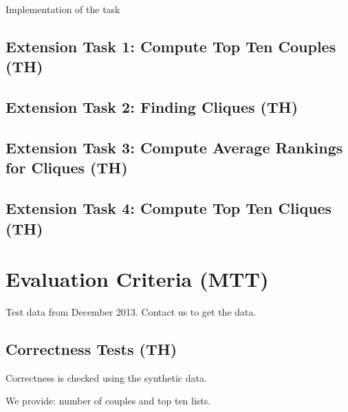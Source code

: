 \documentclass[a4paper]{article}
\begin{document}

Implementation of the task

\subsection{Extension Task 1: Compute Top Ten Couples (TH)}

\subsection{Extension Task 2: Finding Cliques (TH)}


\subsection{Extension Task 3: Compute Average Rankings for Cliques (TH)}

\subsection{Extension Task 4: Compute Top Ten Cliques (TH)}



\section{Evaluation Criteria (MTT)}

Test data from December 2013. Contact us to get the data.

\subsection{Correctness Tests (TH)}

Correctness is checked using the synthetic data.

We provide: number of couples and top ten lists.
\end{document}

